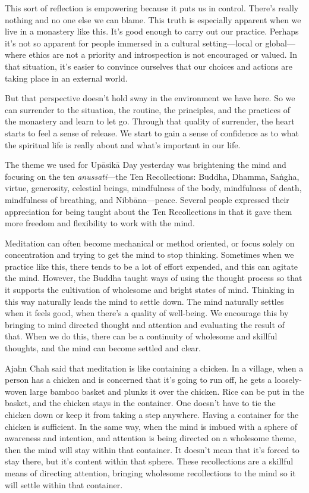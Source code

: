 This sort of reflection is empowering because it puts us in control. 
There's really nothing and no one else we can blame. This truth is 
especially apparent when we live in a monastery like this. It's good 
enough to carry out our practice. Perhaps it's not so apparent for 
people immersed in a cultural setting---local or global---where ethics 
are not a priority and introspection is not encouraged or valued. In 
that situation, it's easier to convince ourselves that our choices and 
actions are taking place in an external world.

But that perspective doesn't hold sway in the environment we have here. 
So we can surrender to the situation, the routine, the principles, and 
the practices of the monastery and learn to let go. Through that 
quality of surrender, the heart starts to feel a sense of release. We 
start to gain a sense of confidence as to what the spiritual life is 
really about and what's important in our life.


The theme we used for Upāsikā Day yesterday was brightening the mind 
and focusing on the ten \emph{anussati}---the Ten Recollections: 
Buddha, Dhamma, Saṅgha, virtue, generosity, celestial beings, 
mindfulness of the body, mindfulness of death, mindfulness of 
breathing, and Nibbāna---peace. Several people expressed their 
appreciation for being taught about the Ten Recollections in that it 
gave them more freedom and flexibility to work with the mind.

Meditation can often become mechanical or method oriented, or focus 
solely on concentration and trying to get the mind to stop thinking. 
Sometimes when we practice like this, there tends to be a lot of effort 
expended, and this can agitate the mind. However, the Buddha taught 
ways of using the thought process so that it supports the cultivation 
of wholesome and bright states of mind. Thinking in this way naturally 
leads the mind to settle down. The mind naturally settles when it feels 
good, when there's a quality of well-being. We encourage this by 
bringing to mind directed thought and attention and evaluating the 
result of that. When we do this, there can be a continuity of wholesome 
and skillful thoughts, and the mind can become settled and clear.

Ajahn Chah said that meditation is like containing a chicken. In a 
village, when a person has a chicken and is concerned that it's going 
to run off, he gets a loosely-woven large bamboo basket and plunks it 
over the chicken. Rice can be put in the basket, and the chicken stays 
in the container. One doesn't have to tie the chicken down or keep it 
from taking a step anywhere. Having a container for the chicken is 
sufficient. In the same way, when the mind is imbued with a sphere of 
awareness and intention, and attention is being directed on a wholesome 
theme, then the mind will stay within that container. It doesn't mean 
that it's forced to stay there, but it's content within that sphere. 
These recollections are a skillful means of directing attention, 
bringing wholesome recollections to the mind so it will settle within 
that container.

